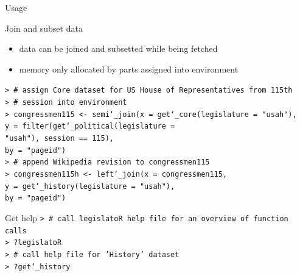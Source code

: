 \begin{frame}{Usage}
\begin{block}{Join and subset data}
\begin{itemize}
\item data can be joined and subsetted while being fetched
\item memory only allocated by parts assigned into environment
\end{itemize}
\scriptsize{\texttt{> \# assign Core dataset for US House of Representatives from 115th}}\\ 
\scriptsize{\texttt{> \# session into environment}} \\
\scriptsize{\texttt{> congressmen115 <- semi\char`_join(x = get\char`_core(legislature = "usah"),}}\\
\scriptsize{\texttt{\enspace\enspace\enspace\enspace\enspace\enspace\enspace\enspace\enspace\enspace\enspace\enspace\enspace\enspace\enspace\enspace\enspace\enspace\enspace\enspace\enspace\enspace\enspace\enspace\enspace\enspace\enspace\enspace\enspace\enspace y = filter(get\char`_political(legislature =}} \\
\scriptsize{\texttt{\enspace\enspace\enspace\enspace\enspace\enspace\enspace\enspace\enspace\enspace\enspace\enspace\enspace\enspace\enspace\enspace\enspace\enspace\enspace\enspace\enspace\enspace\enspace\enspace\enspace\enspace\enspace\enspace\enspace\enspace\enspace\enspace\enspace\enspace "usah"), session == 115),}}\\
\scriptsize{\texttt{\enspace\enspace\enspace\enspace\enspace\enspace\enspace\enspace\enspace\enspace\enspace\enspace\enspace\enspace\enspace\enspace\enspace\enspace\enspace\enspace\enspace\enspace\enspace\enspace\enspace\enspace\enspace\enspace\enspace\enspace by = "pageid")}}\\
\scriptsize{\texttt{> \# append Wikipedia revision to congressmen115}}\\ 
\scriptsize{\texttt{> congressmen115h <- left\char`_join(x = congressmen115,}}\\
\scriptsize{\texttt{\enspace\enspace\enspace\enspace\enspace\enspace\enspace\enspace\enspace\enspace\enspace\enspace\enspace\enspace\enspace\enspace\enspace\enspace\enspace\enspace\enspace\enspace\enspace\enspace\enspace\enspace\enspace\enspace\enspace\enspace\enspace y = get\char`_history(legislature = "usah"),}}\\ 
\scriptsize{\texttt{\enspace\enspace\enspace\enspace\enspace\enspace\enspace\enspace\enspace\enspace\enspace\enspace\enspace\enspace\enspace\enspace\enspace\enspace\enspace\enspace\enspace\enspace\enspace\enspace\enspace\enspace\enspace\enspace\enspace\enspace\enspace by = "pageid")}}
\end{block}
\pause
\begin{block}{Get help}
\scriptsize{\texttt{> \# call legislatoR help file for an overview of function calls}}\\
\scriptsize{\texttt{> ?legislatoR}}\\
\scriptsize{\texttt{> \# call help file for 'History' dataset}}\\
\scriptsize{\texttt{> ?get\char`_history}}\\
\end{block}
\end{frame}

